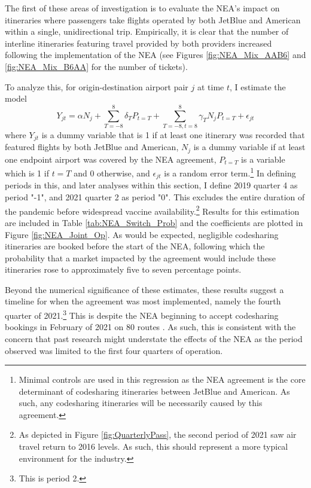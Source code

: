 \documentclass{article}
\begin{document}
    
        
	The first of these areas of investigation is to evaluate the NEA's impact on itineraries where passengers take flights operated by both JetBlue and American within a single, unidirectional trip. Empirically, it is clear that the number of interline itineraries featuring travel provided by both providers increased following the implementation of the NEA (see Figures \ref{fig:NEA_Mix_AAB6} and \ref{fig:NEA_Mix_B6AA} for the number of tickets). 
	
	To analyze this, for origin-destination airport pair $j$ at time $t$,  I estimate the model \[Y_{jt} = \alpha N_{j} + \sum_{T = -8}^{8} \delta_{T} P_{t = T} + \sum_{T = -8, t = 8}^{8} \gamma_{T} N_{j} P_{t = T} + \epsilon_{jt}\] where $Y_{jt}$ is a dummy variable that is 1 if at least one itinerary was recorded that featured flights by both JetBlue and American,  $N_{j}$ is a dummy variable if at least one endpoint airport was covered by the NEA agreement, $P_{t = T}$ is a variable which is 1 if $t = T$ and 0 otherwise, and $\epsilon_{jt}$ is a random error term.\footnote{Minimal controls are used in this regression as the NEA agreement is the core determinant of codesharing itineraries between JetBlue and American. As such, any codesharing itineraries will be necessarily caused by this agreement.} In defining periods in this, and later analyses within this section, I define 2019 quarter 4 as period "-1", and 2021 quarter 2 as period "0". This excludes the entire duration of the pandemic before widespread vaccine availability.\footnote{As depicted in Figure \ref{fig:QuarterlyPass}, the second period of 2021 saw air travel return to 2016 levels. As such, this should represent a more typical environment for the industry.} Results for this estimation are included in Table \ref{tab:NEA_Switch_Prob} and the coefficients are plotted in Figure \ref{fig:NEA_Joint_Op}. As would be expected, negligible codesharing itineraries are booked before the start of the NEA, following which the probability that a market impacted by the agreement would include these itineraries rose to approximately five to seven percentage points. 
	
	Beyond the numerical significance of these estimates, these results suggest a timeline for when the agreement was most implemented, namely the fourth quarter of 2021.\footnote{This is period 2.} This is despite the NEA beginning to accept codesharing bookings in February of 2021 on 80 routes \citep{griff_8_2021}. As such, this is consistent with the concern that past research might understate the effects of the NEA as the period observed was limited to the first four quarters of operation.
	
\end{document}
